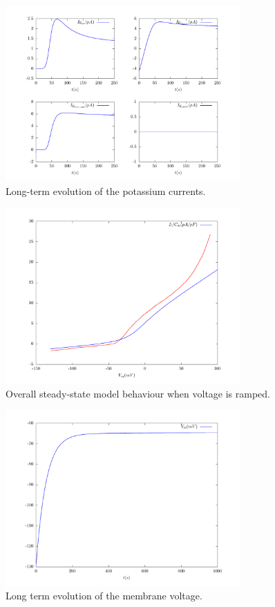 \begin{figure}
  \centering
  \includegraphics[width=0.8\textwidth]
  {../results/pdf/20110506/potassium_currents-ti}
  \caption{Long-term evolution of the potassium currents.}
  \label{fig:potassium-currents-ti}
\end{figure}

\begin{figure}
  \centering
  \includegraphics[width=0.8\textwidth]
  {../results/pdf/20110506/membrane_behaviour-vi}
  \caption{Overall steady-state model behaviour when voltage is ramped.}
  \label{fig:overall-behaviour-vi}
\end{figure}

\begin{figure}
  \centering
  \includegraphics[width=0.8\textwidth]
  {../results/pdf/20110506/membrane_behaviour-tv}
  \caption{Long term evolution of the membrane voltage.}
  \label{fig:overall-behaviour-tv}
\end{figure}

